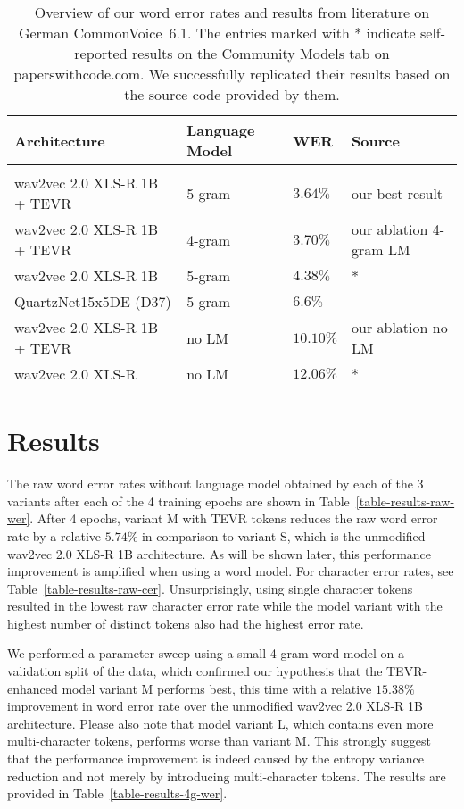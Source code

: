 \begin{table}[p]
\begin{center}
\begin{tabular}{l l l l}
Architecture & Language Model & WER & Source \\
\hline \\
wav2vec 2.0 XLS-R 1B + TEVR & 5-gram & $\bm{3.64\%}$ & our best result \\
wav2vec 2.0 XLS-R 1B + TEVR & 4-gram & $3.70\%$ & our ablation 4-gram LM \\
wav2vec 2.0 XLS-R 1B & 5-gram & $4.38\%$ & \citet{flozi} * \\
QuartzNet15x5DE (D37) & 5-gram & $6.6\%$ & \citet{scribosermo} \\
wav2vec 2.0 XLS-R 1B + TEVR & no LM & $10.10\%$ & our ablation no LM \\
wav2vec 2.0 XLS-R & no LM & $12.06\%$ & \citet{grosman} * \\
\end{tabular}
\end{center}
\caption{Overview of our word error rates and results from literature on German CommonVoice~6.1. The entries marked with * indicate self-reported results on the Community Models tab on paperswithcode.com. We successfully replicated their results based on the source code provided by them.}
\label{table-results-final-wer}
\end{table}

\FloatBarrier

\section{Results}

The raw word error rates without language model obtained by each of the 3 variants after each of the 4 training epochs are shown in Table~\ref{table-results-raw-wer}. After 4 epochs, variant M with TEVR tokens reduces the raw word error rate by a relative $5.74\%$ in comparison to variant S, which is the unmodified wav2vec 2.0 XLS-R 1B architecture. 
As will be shown later, this performance improvement is amplified when using a word model.
For character error rates, see Table~\ref{table-results-raw-cer}. Unsurprisingly, using single character tokens resulted in the lowest raw character error rate while the model variant with the highest number of distinct tokens also had the highest error rate.

We performed a parameter sweep using a small 4-gram word model on a validation split of the data, which confirmed our hypothesis that the TEVR-enhanced model variant M performs best, this time with a relative $15.38\%$ improvement in word error rate over the unmodified wav2vec 2.0 XLS-R 1B architecture. Please also note that model variant L, which contains even more multi-character tokens, performs worse than variant M. This strongly suggest that the performance improvement is indeed caused by the entropy variance reduction and not merely by introducing multi-character tokens. The results are provided in Table~\ref{table-results-4g-wer}. 

